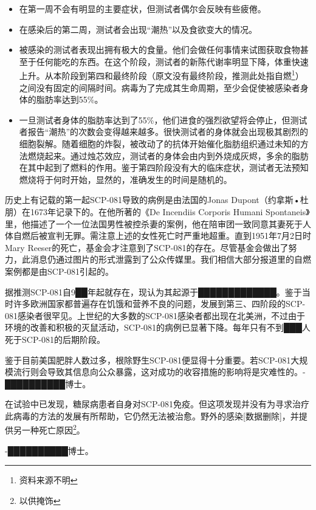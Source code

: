 \begin{itemize}
\item {}在第一周不会有明显的主要症状，但测试者偶尔会反映有些疲倦。
\item {}在感染后的第二周，测试者会出现“潮热”以及食欲变大的情况。
\item {}被感染的测试者表现出拥有极大的食量。他们会做任何事情来试图获取食物甚至于任何能吃的东西。在这个阶段，测试者的新陈代谢率明显下降，体重快速上升。从本阶段到第四和最终阶段（原文没有最终阶段，推测此处指自燃\footnote{资料来源不明}）之间没有固定的间隔时间。病毒为了完成其生命周期，至少会促使被感染者身体的脂肪率达到55\%。
\item {}一旦测试者身体的脂肪率达到了55\%，他们进食的强烈欲望将会停止，但测试者报告“潮热”的次数会变得越来越多。很快测试者的身体就会出现极其剧烈的细胞裂解。随着细胞的炸裂，被改动了的抗体开始催化脂肪组织通过未知的方法燃烧起来。通过烛芯效应，测试者的身体会由内到外烧成灰烬，多余的脂肪在其中起到了燃料的作用。鉴于第四阶段没有大的临床症状，测试者无法预知燃烧将于何时开始，显然的，准确发生的时间是随机的。
\end{itemize}

历史上有记载的第一起SCP-081导致的病例是由法国的Jonas Dupont（约拿斯•杜朋）在1673年记录下的。在他所著的《De Incendiis Corporis Humani Spontaneis》里，他描述了一个一位法国男性被控杀妻的案例，他在陪审团一致同意其妻死于人体自燃后被宣判无罪。需注意上述的女性死亡时严重地超重。直到1951年7月2日时Mary Reeser的死亡，基金会才注意到了SCP-081的存在。尽管基金会做出了努力，此消息仍通过图片的形式泄露到了公众传媒里。我们相信大部分报道里的自燃案例都是由SCP-081引起的。

据推测SCP-081自9██年起就存在，现认为其起源于█████████████。鉴于当时许多欧洲国家都普遍存在饥饿和营养不良的问题，发展到第三、四阶段的SCP-081感染者很罕见。上世纪的大多数的SCP-081感染者都出现在北美洲，不过由于环境的改善和积极的灭鼠活动，SCP-081的病例已显著下降。每年只有不到███人死于SCP-081的后期阶段。

鉴于目前美国肥胖人数过多，根除野生SCP-081便显得十分重要。若SCP-081大规模流行则会导致其信息向公众暴露，这对成功的收容措施的影响将是灾难性的。-██████████博士。

在试验中已发现，糖尿病患者自身对SCP-081免疫。但这项发现并没有为寻求治疗此病毒的方法的发展有所帮助，它仍然无法被治愈。野外的感染{[}数据删除]，并提供另一种死亡原因\footnote{以供掩饰}。

-██████████博士。
